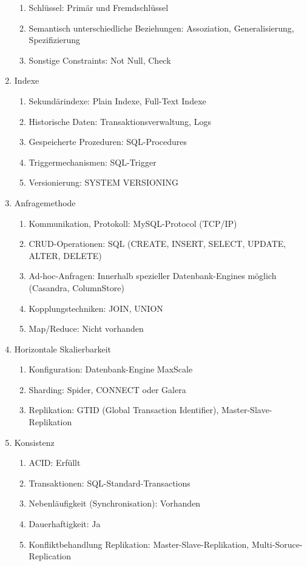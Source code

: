 \begin{enumerate}
\begin{enumerate}
		\item Schlüssel: Primär und Fremdschlüssel
		\item Semantisch unterschiedliche Beziehungen: Assoziation, Generalisierung, Spezifizierung
		\item Sonstige Constraints: Not Null, Check
	\end{enumerate}
	\item Indexe
	\begin{enumerate}
		\item Sekundärindexe: Plain Indexe, Full-Text Indexe
		\item Historische Daten: Transaktionsverwaltung, Logs
		\item Gespeicherte Prozeduren: SQL-Procedures
		\item Triggermechanismen: SQL-Trigger
		\item Versionierung: SYSTEM VERSIONING
	\end{enumerate}
	\item Anfragemethode
	\begin{enumerate}
		\item Kommunikation, Protokoll: MySQL-Protocol (TCP/IP)
		\item CRUD-Operationen: SQL (CREATE, INSERT, SELECT, UPDATE, ALTER, DELETE)
		\item Ad-hoc-Anfragen: Innerhalb spezieller Datenbank-Engines möglich (Casandra, ColumnStore)
		\item Kopplungstechniken: JOIN, UNION
		\item Map/Reduce: Nicht vorhanden
	\end{enumerate}
	\item Horizontale Skalierbarkeit
	\begin{enumerate}
		\item Konfiguration: Datenbank-Engine MaxScale
		\item Sharding: Spider, CONNECT oder Galera
		\item Replikation: GTID (Global Transaction Identifier), Master-Slave-Replikation
	\end{enumerate}
	\item Konsistenz
	\begin{enumerate}
		\item ACID: Erfüllt
		\item Transaktionen: SQL-Standard-Transactions
		\item Nebenläufigkeit (Synchronisation): Vorhanden
		\item Dauerhaftigkeit: Ja
		\item Konfliktbehandlung Replikation: Master-Slave-Replikation, Multi-Soruce-Replication

\end{enumerate}
\end{enumerate}
